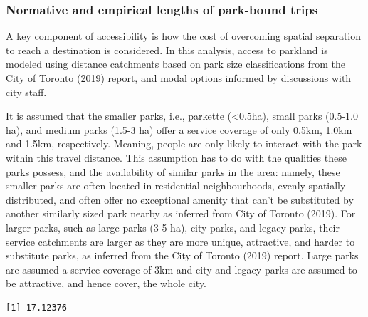 \documentclass[
11pt, %
oneside, %
english, %
singlespacing, %
]{macthesis} %
\begin{document}
\subsubsection{Normative and empirical lengths of park-bound trips}\label{normative-and-empirical-lengths-of-park-bound-trips}

A key component of accessibility is how the cost of overcoming spatial separation to reach a destination is considered. In this analysis, access to parkland is modeled using distance catchments based on park size classifications from the City of Toronto (2019) report, and modal options informed by discussions with city staff.

It is assumed that the smaller parks, i.e., parkette (\textless0.5ha), small parks (0.5-1.0 ha), and medium parks (1.5-3 ha) offer a service coverage of only 0.5km, 1.0km and 1.5km, respectively. Meaning, people are only likely to interact with the park within this travel distance. This assumption has to do with the qualities these parks possess, and the availability of similar parks in the area: namely, these smaller parks are often located in residential neighbourhoods, evenly spatially distributed, and often offer no exceptional amenity that can't be substituted by another similarly sized park nearby as inferred from City of Toronto (2019). For larger parks, such as large parks (3-5 ha), city parks, and legacy parks, their service catchments are larger as they are more unique, attractive, and harder to substitute parks, as inferred from the City of Toronto (2019) report. Large parks are assumed a service coverage of 3km and city and legacy parks are assumed to be attractive, and hence cover, the whole city.

\begin{verbatim}
[1] 17.12376
\end{verbatim}
\end{document}
